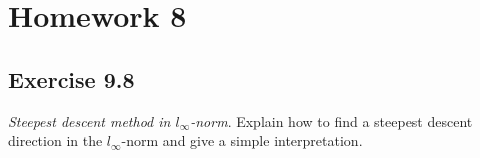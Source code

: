 \section{Homework 8}
\subsection{Exercise 9.8}
\textit{Steepest descent method in $l_\infty$-norm}. Explain how to find a steepest descent direction in the $l_\infty$-norm and give a simple interpretation.